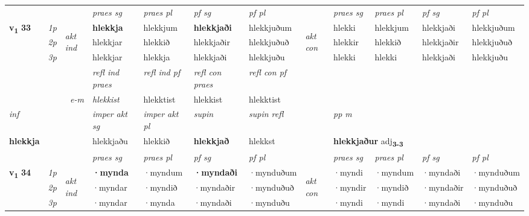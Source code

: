 \begin{longtable}[l]{X>{\footnotesize\itshape}llXXXXlXXXX}
 & &   & \textit{praes sg}  & \textit{praes pl}    & \textit{ pf sg} & \textit{pf pl} & & \textit{praes sg}  & \textit{praes pl}    & \textit{pf sg} & \textit{pf pl }  \\ \cmidrule{4-7} \cmidrule{9-12}
 \multirow{2}{*}{{{\textbf{v{\textsubscript{1}}} \Large{\textbf{33}}}}}  & 1p & \multirow{3}{*}{\begin{turn}{90}\textit{akt ind}\end{turn}} & \textbf{hlekkja} & hlekkjum & \textbf{hlekkjaði} & hlekkjuðum & \multirow{3}{*}{\begin{turn}{90}\textit{akt con}\end{turn}} &hlekki & hlekkjum & hlekkjaði & hlekkjuðum\\*
 & 2p &  &  hlekkjar  & hlekkið & hlekkjaðir & hlekkjuðuð & & hlekkir & hlekkið & hlekkjaðir & hlekkjuðuð \\*
 & 3p &  & hlekkjar & hlekkja & hlekkjaði & hlekkjuðu & & hlekki & hlekki& hlekkjaði & hlekkjuðu \\*
\cmidrule{4-7} \cmidrule{9-12}

 & && \textit{refl ind praes} & \textit{refl ind pf} & \textit{refl con praes} & \textit{refl con pf} \\*
\multicolumn{3}{r}{\textit{e-m}}& hlekkist & hlekktist & hlekkist & hlekktist \\*

\cmidrule{4-7}
   {\textit{inf}} & &  & \textit{imper akt sg} & \textit{imper akt pl}    & \textit{supin} & \textit{supin refl} && \textit{pp m} \\*
  {\textbf{hlekkja}} & && hlekkjaðu  & hlekkið    &  \textbf{hlekkjað} & hlekkst && \multicolumn{2}{l}{\textbf{hlekkjaður} adj\textbf{\textsubscript{3-3}}} \\*

\midrule

 & &   & \textit{praes sg}  & \textit{praes pl}    & \textit{ pf sg} & \textit{pf pl} & & \textit{praes sg}  & \textit{praes pl}    & \textit{pf sg} & \textit{pf pl }  \\ \cmidrule{4-7} \cmidrule{9-12}
 \multirow{2}{*}{{{\textbf{v{\textsubscript{1}}} \Large{\textbf{34}}}}}  & 1p & \multirow{3}{*}{\begin{turn}{90}\textit{akt ind}\end{turn}} & \textbf{·mynda} & ·myndum & \textbf{·myndaði} & ·mynduðum & \multirow{3}{*}{\begin{turn}{90}\textit{akt con}\end{turn}} &·myndi & ·myndum & ·myndaði & ·mynduðum\\*
 & 2p &  &  ·myndar  & ·myndið & ·myndaðir & ·mynduðuð & & ·myndir & ·myndið & ·myndaðir & ·mynduðuð \\*
 & 3p &  & ·myndar & ·mynda & ·myndaði & ·mynduðu & & ·myndi & ·myndi& ·myndaði & ·mynduðu \\*
\cmidrule{4-7} \cmidrule{9-12}


\end{longtable}
